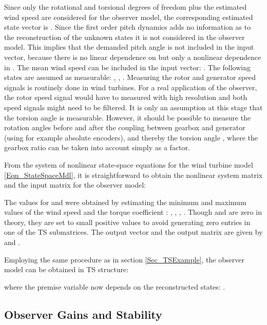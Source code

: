 \documentclass[a4paper]{article}
\begin{document}
Since only the rotational and torsional degrees of freedom plus the estimated wind speed are considered for the observer model, the corresponding estimated state vector is
\newline . Since the first order pitch dynamics adds no information as to the reconstruction of the unknown states it is not considered in the observer model. This implies that the demanded pitch angle  is not included in the input vector, because there is no linear dependence on  but only a nonlinear dependence in .
The mean wind speed  can be included in the input vector: .
The following states are assumed as measurable: , , . Measuring the rotor and generator speed signals is routinely done in wind turbines. For a real application of the observer, the rotor speed signal would have to measured with high resolution and both speed signals might need to be filtered. It is only an assumption at this stage that the torsion angle is measurable. However, it should be possible to measure the rotation angles before and after the coupling between gearbox and generator (using for example absolute encoders), and thereby the torsion angle , where the gearbox ratio can be taken into account simply as a factor.

From the system of nonlinear state-space equations for the wind turbine model \eqref{Eqn_StateSpaceMdl}, it is straightforward to obtain the nonlinear system matrix and the input matrix for the observer model:





The values for  and  were obtained by estimating the minimum and maximum values of the wind speed  and the torque coefficient : ,  , , . Though  and  are zero in theory, they are set to small positive values to avoid generating zero entries in one of the TS submatrices.
The output vector and the output matrix are given by  and .

Employing the same procedure as in section \ref{Sec_TSExample}, the observer model can be obtained in TS structure:


\newline where the premise variable  now depends on the reconstructed states: .



\subsection{\label{Sec_Gains_and_Stability}Observer Gains and Stability}
\end{document}
